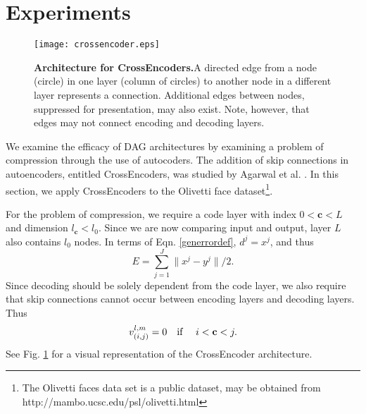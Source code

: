 \documentclass{jcmlatex}
\begin{document}
\section{Experiments}\label{sec:experiment}\begin{figure}
\centering
\texttt{[image: crossencoder.eps]}
\caption{\textbf{Architecture for CrossEncoders.}A directed edge from a node (circle) in one layer (column of circles) to another node in a different layer represents a connection. Additional edges  between nodes, suppressed for presentation, may also exist. Note, however, that edges may not connect encoding and decoding layers. }\label{autofig}
\end{figure}

We examine the efficacy of DAG architectures by  examining a problem of compression through the use of autocoders. The addition of skip connections in autoencoders, entitled CrossEncoders, was studied by Agarwal et al. \cite{agarwal2018crossencoder}.  In this section, we apply CrossEncoders to the Olivetti face dataset\footnote{ The Olivetti faces data set is a public dataset, may be obtained from http://mambo.ucsc.edu/psl/olivetti.html}.

For the problem of compression, we require a code layer with index $0<\mathbf c<L$ and dimension $l_\mathbf c < l_0$. Since we are now comparing input and output, layer $L$ also contains $l_0$ nodes. In terms of Eqn.  \ref{generrordef}, $d^j = x^j$, and thus
\begin{equation}
E = \sum_{j = 1}^J \|x^j-y^j\|/2.
\end{equation}
Since decoding should be solely dependent  from the code layer, we also require that skip connections cannot occur between encoding layers and decoding layers.  Thus
 \begin{equation}
 v_{(i,j)}^{l,m} = 0 \quad \hbox{if }  \quad i<\mathbf c < j. \label{encoderequire}
 \end{equation}
 See Fig. \ref{autofig} for a visual representation of the CrossEncoder architecture.
\end{document}
